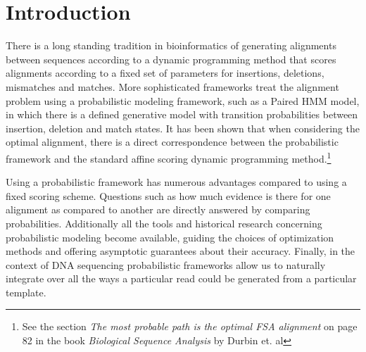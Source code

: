 \documentclass[fleqn,10pt]{SelfArx} %
\begin{document}
\flushbottom %

\maketitle %

\tableofcontents %

\thispagestyle{empty} %


\section*{Introduction} %


There is a long standing tradition in bioinformatics of generating alignments between sequences according to a dynamic programming method that scores alignments according to a fixed set of parameters for insertions, deletions, mismatches and matches.  More sophisticated frameworks treat the alignment problem using a probabilistic modeling framework, such as a Paired HMM model, in which there is a defined generative model with transition probabilities between insertion, deletion and match states.  It has been shown that when considering the optimal alignment, there is a direct correspondence between the probabilistic framework and the standard affine scoring dynamic programming method.\footnote{See the section \textit{The most probable path is the optimal FSA alignment} on page 82 in the book \textit{Biological Sequence Analysis} by Durbin et. al}

Using a probabilistic framework has numerous advantages compared to using a fixed scoring scheme.  Questions such as how much evidence is there for one alignment as compared to another are directly answered by comparing probabilities.  Additionally all the tools and historical research concerning probabilistic modeling become available, guiding the choices of optimization methods and offering asymptotic guarantees about their accuracy.  Finally, in the context of DNA sequencing probabilistic frameworks allow us to naturally integrate over all the ways a particular read could be generated from a particular template.
\end{document}
